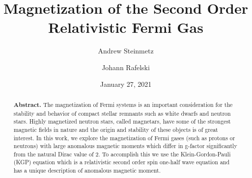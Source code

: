 \documentclass[
aps,
pra,
twocolumn,
showpacs,
preprintnumbers,
amsmath,
amssymb,
footinbib
]{revtex4-2}
\begin{document}

\title{Magnetization of the Second Order Relativistic Fermi Gas}
\author{Andrew Steinmetz}
\author{Johann Rafelski}
\date{January 27, 2021}

\begin{abstract}
\noindent\textbf{Abstract.} The magnetization of Fermi systems is an important consideration for the stability and behavior of compact stellar remnants such as white dwarfs and neutron stars. Highly magnetized neutron stars, called magnetars, have some of the strongest magnetic fields in nature and the origin and stability of these objects is of great interest. In this work, we explore the magnetization of Fermi gases (such as protons or neutrons) with large anomalous magnetic moments which differ in g-factor significantly from the natural Dirac value of 2. To accomplish this we use the Klein-Gordon-Pauli (KGP) equation which is a relativistic second order spin one-half wave equation and has a unique description of anomalous magnetic moment. 
\end{abstract}
\maketitle
\end{document}
